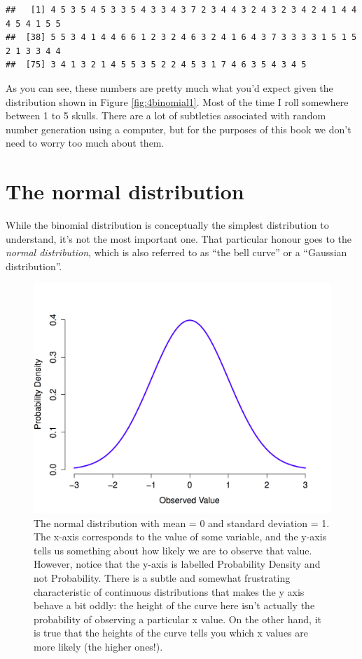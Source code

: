 \documentclass[]{book}
\begin{document}
\begin{verbatim}
##   [1] 4 5 3 5 4 5 3 3 5 4 3 3 4 3 7 2 3 4 4 3 2 4 3 2 3 4 2 4 1 4 4 4 5 4 1 5 5
##  [38] 5 5 3 4 1 4 4 6 6 1 2 3 2 4 6 3 2 4 1 6 4 3 7 3 3 3 3 1 5 1 5 2 1 3 3 4 4
##  [75] 3 4 1 3 2 1 4 5 5 3 5 2 2 4 5 3 1 7 4 6 3 5 4 3 4 5
\end{verbatim}

As you can see, these numbers are pretty much what you'd expect given the distribution shown in Figure \ref{fig:4binomial1}. Most of the time I roll somewhere between 1 to 5 skulls. There are a lot of subtleties associated with random number generation using a computer, but for the purposes of this book we don't need to worry too much about them.

\hypertarget{the-normal-distribution}{%
\section{The normal distribution}\label{the-normal-distribution}}

While the binomial distribution is conceptually the simplest distribution to understand, it's not the most important one. That particular honour goes to the \emph{normal distribution}, which is also referred to as ``the bell curve'' or a ``Gaussian distribution''.

\begin{figure}
\centering
\includegraphics{navarro_img/probability/standardNormal-eps-converted-to.png}
\caption{\label{fig:4normal}The normal distribution with mean = 0 and standard deviation = 1. The x-axis corresponds to the value of some variable, and the y-axis tells us something about how likely we are to observe that value. However, notice that the y-axis is labelled Probability Density and not Probability. There is a subtle and somewhat frustrating characteristic of continuous distributions that makes the y axis behave a bit oddly: the height of the curve here isn't actually the probability of observing a particular x value. On the other hand, it is true that the heights of the curve tells you which x values are more likely (the higher ones!).}
\end{figure}
\end{document}
